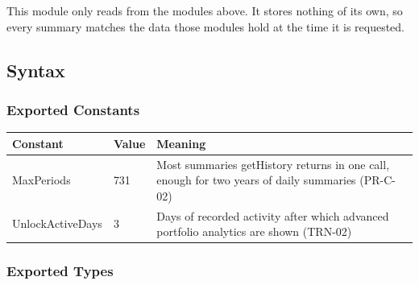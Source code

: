 \documentclass[12pt, titlepage]{article}
\begin{document}
\noindent This module only reads from the modules above. It stores nothing
of its own, so every summary matches the data those modules hold at the
time it is requested.

\subsection{Syntax}

\subsubsection{Exported Constants}

\begin{center}
\renewcommand{\arraystretch}{1.2}
\begin{tabular}{l l >{\raggedright\arraybackslash}p{7.5cm}}
\toprule
\textbf{Constant} & \textbf{Value} & \textbf{Meaning}\\
\midrule
\textsf{MaxPeriods} & 731 & Most summaries getHistory returns in one call,
  enough for two years of daily summaries (PR-C-02)\\
\textsf{UnlockActiveDays} & 3 & Days of recorded activity after which
  advanced portfolio analytics are shown (TRN-02)\\
\bottomrule
\end{tabular}
\end{center}

\subsubsection{Exported Types}
\end{document}
